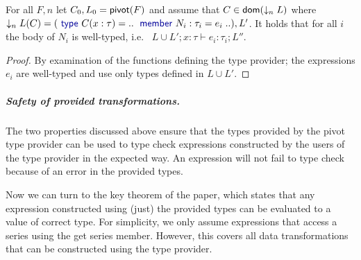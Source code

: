 \documentclass[a4paper,UKenglish]{lipics-v2016}
\theoremstyle{plain}
\theoremstyle{definition}
\newcommand{\kvd}[1]{\textnormal{\textcolor{kvdclr}{\sffamily #1}}}
\newcommand{\ident}[1]{\textnormal{\sffamily #1}}
\newcommand{\qident}[1]{\textnormal{\sffamily \guillemotleft #1\guillemotright}}
\newcommand{\dom}{\ident{dom}}
\begin{document}
\begin{theorem}
\label{thm:pivot-well}
For all $F,n$ let $C_0,L_0=\ident{pivot}(F)$ and assume that $C \in \dom(\downarrow_{n} L)$ 
where $\downarrow_{n} L(C) = (\kvd{type}~C(x:\tau) = ..\;\kvd{member}~N_i:\tau_i= e_i\;..), L'$.
It holds that for all $i$ the body of $N_i$ is well-typed, i.e.~
$L \cup L'; x:\tau \vdash e_i : \tau_i; L''$.
\end{theorem}
\begin{proof}
By examination of the functions defining the type provider; the expressions $e_i$ are well-typed
and use only types defined in $L\cup L'$.
\end{proof}

\subparagraph{Safety of provided transformations.}
The two properties discussed above ensure that the types provided by the pivot type provider can 
be used to type check expressions constructed by the users of the type provider in the expected
way. An expression will not fail to type check because of an error in the provided types. 

Now we can turn to the key theorem of the paper, which states that any expression constructed 
using (just) the provided types can be evaluated to a value of correct type. For simplicity, we
only assume expressions that access a series using the \qident{get series} member. However, this
covers all data transformations that can be constructed using the type provider.
\end{document}
